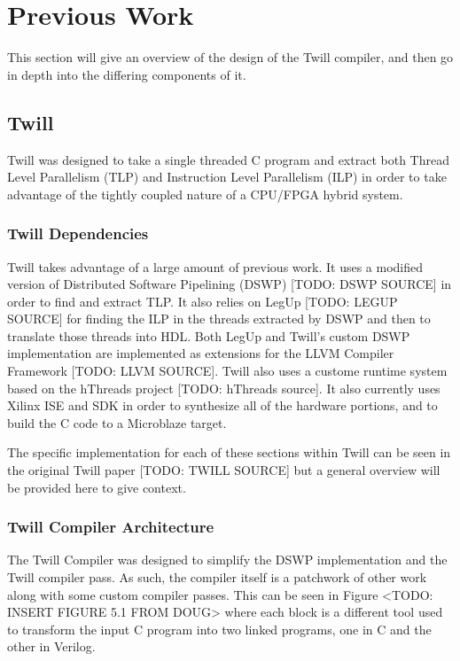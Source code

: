\chapter{Previous Work\label{chap:PrevWork}}
This section will give an overview of the design of the Twill compiler, and then go in depth into the differing components of it.
\section{Twill}
Twill was designed to take a single threaded C program and extract both Thread Level Parallelism (TLP) and Instruction Level Parallelism (ILP) in order to take advantage of the tightly coupled nature of a CPU/FPGA hybrid system.
\subsection{Twill Dependencies}
Twill takes advantage of a large amount of previous work. It uses a modified version of Distributed Software Pipelining (DSWP) [TODO: DSWP SOURCE] in order to find and extract TLP. It also relies on LegUp [TODO: LEGUP SOURCE] for finding the ILP in the threads extracted by DSWP and then to translate those threads into HDL. Both LegUp and Twill's custom DSWP implementation are implemented as extensions for the LLVM Compiler Framework [TODO: LLVM SOURCE]. Twill also uses a custome runtime system based on the hThreads project [TODO: hThreads source]. It also currently uses Xilinx ISE and SDK in order to synthesize all of the hardware portions, and to build the C code to a Microblaze target.

The specific implementation for each of these sections within Twill can be seen in the original Twill paper [TODO: TWILL SOURCE] but a general overview will be provided here to give context.

\subsection{Twill Compiler Architecture}
The Twill Compiler was designed to simplify the DSWP implementation and the Twill compiler pass. As such, the compiler itself is a patchwork of other work along with some custom compiler passes. This can be seen in Figure <TODO: INSERT FIGURE 5.1 FROM DOUG> where each block is a different tool used to transform the input C program into two linked programs, one in C and the other in Verilog.

